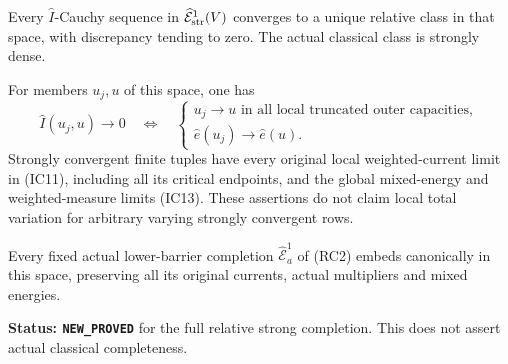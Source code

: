 \begin{theorem}
\label{thm:r11-complete-strong-first-energy-space}
Every $\widehat I$-Cauchy sequence in
$\widehat{\mathcal E}^1_{\rm str}(V)$ converges to a unique
relative class in that space, with discrepancy tending to zero.
The actual classical class is strongly dense.

For members $u_j,u$ of this space, one has
\[
 \widehat I(u_j,u)\longrightarrow0
 \quad\Longleftrightarrow\quad
 \left\{
 \begin{array}{l}
 u_j\longrightarrow u\text{ in all local truncated outer capacities},\\
 \widehat e(u_j)\longrightarrow\widehat e(u).
 \end{array}\right.
 \tag{IC20}
\]
Strongly convergent finite tuples have every original local
weighted-current limit in (IC11), including all its critical
endpoints, and the global mixed-energy and weighted-measure
limits (IC13). These assertions do not claim local total
variation for arbitrary varying strongly convergent rows.

Every fixed actual lower-barrier completion
$\widehat{\mathcal E}^1_a$ of (RC2) embeds canonically in this
space, preserving all its original currents, actual multipliers
and mixed energies.
\end{theorem}

\noindent\textbf{Status: \texttt{NEW\_PROVED}} for the full relative
strong completion. This does not assert actual classical
completeness.

